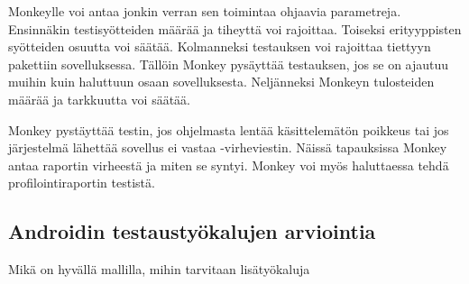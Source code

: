 Monkeylle voi antaa jonkin verran sen toimintaa ohjaavia parametreja. Ensinnäkin testisyötteiden määrää ja tiheyttä voi rajoittaa. Toiseksi erityyppisten syötteiden osuutta voi säätää. Kolmanneksi testauksen voi rajoittaa tiettyyn pakettiin sovelluksessa. Tällöin Monkey pysäyttää testauksen, jos se on ajautuu muihin kuin haluttuun osaan sovelluksesta. Neljänneksi Monkeyn tulosteiden määrää ja tarkkuutta voi säätää.

Monkey pystäyttää testin, jos ohjelmasta lentää käsittelemätön poikkeus tai jos järjestelmä lähettää sovellus ei vastaa -virheviestin. Näissä tapauksissa Monkey antaa raportin virheestä ja miten se syntyi. Monkey voi myös haluttaessa tehdä profilointiraportin testistä.\cite{android}

\subsection{Androidin testaustyökalujen arviointia}

Mikä on hyvällä mallilla, mihin tarvitaan lisätyökaluja